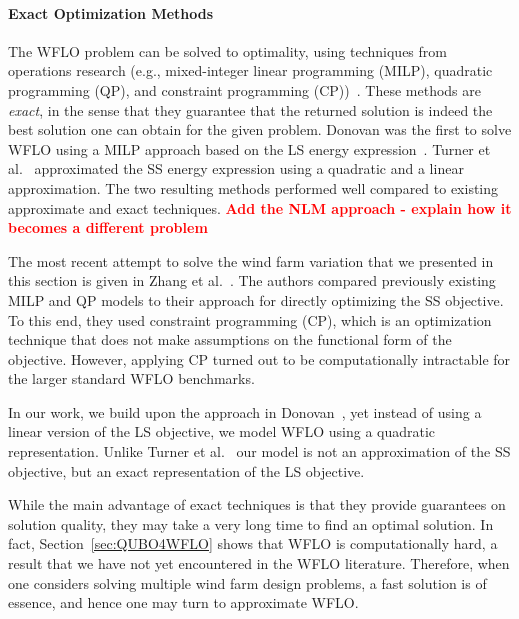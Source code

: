 \documentclass[preprint,12pt]{elsarticle}
\newcommand{\todo}[1]{{\textcolor{red}{\bf {#1}}}}
\begin{document}
\paragraph{Exact Optimization Methods} 
The WFLO problem can be solved  
to optimality, using
techniques from operations research (e.g., mixed-integer linear programming (MILP), quadratic programming (QP), and constraint programming (CP))~\cite{Zhang2014,turner2014new,donovan2005wind}.
These methods are \emph{exact}, in the sense that they guarantee that the returned solution is indeed
the best solution one can obtain for the given problem. Donovan was the first to solve WFLO using a
MILP approach based on the LS energy expression~\cite{donovan2005wind}. Turner et al.\ \cite{turner2014new} approximated the SS energy expression using a quadratic and a linear approximation. The two resulting methods performed well
compared to existing approximate and exact techniques.
\todo{Add the NLM approach - explain how it becomes a different problem \cite{ulku2019new}} 

The most recent attempt to solve the wind farm variation that we presented 
in this section is given in Zhang et al.\ \cite{Zhang2014}. The authors compared
previously existing MILP and QP models to their approach for directly optimizing the SS objective. To this end, they used constraint programming (CP), which 
is an optimization technique that does not make assumptions on the functional form of the objective.
However, applying CP turned out to be computationally intractable for the larger standard WFLO benchmarks. 

In our work, we build upon the approach in Donovan~\cite{donovan2005wind}, yet instead of using a linear version of the LS objective, we 
model WFLO using a quadratic representation. %
Unlike Turner et al.\ \cite{turner2014new} our model is not an approximation of the SS objective, 
but an exact representation of the LS objective.

While the main advantage of exact techniques
is that they provide guarantees on solution quality, they may take a very long time to  find an optimal solution. 
In fact, Section~\ref{sec:QUBO4WFLO} shows that WFLO is computationally hard, a result
that we have not yet encountered in the WFLO literature. Therefore,
when one considers solving multiple wind farm design problems, a fast solution is of essence,
and hence one may turn to approximate WFLO.
\end{document}
